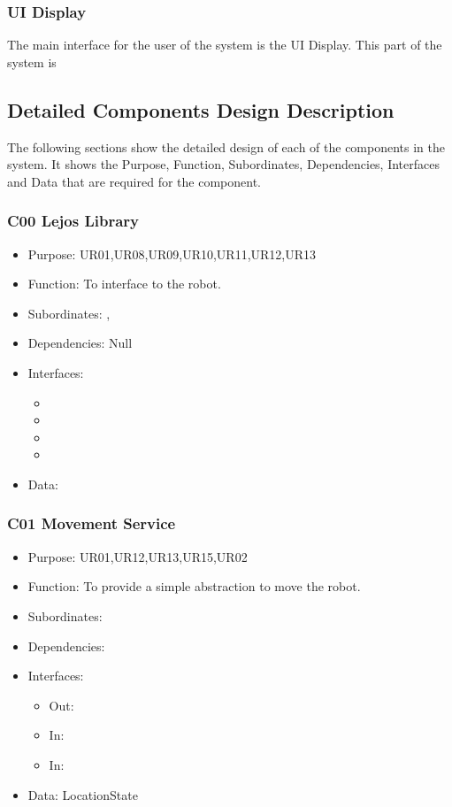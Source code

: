 \subsubsection*{UI Display}
The main interface for the user of the system is the UI Display. This part of the system is 

\subsection{Detailed Components Design Description}\label{detailedSection}
The following sections show the detailed design of each of the components in the system. It shows the Purpose, Function, Subordinates, Dependencies, Interfaces and Data that are required for the component.

\subsubsection{C00 Lejos Library}\label{compLejos}
\begin{itemize}
	\item Purpose: UR01,UR08,UR09,UR10,UR11,UR12,UR13
	\item Function: To interface to the robot. 
	\item Subordinates: ,  
	\item Dependencies: Null
	\item Interfaces:
	\begin{itemize}
		\item \texttt{}
		\item \texttt{}
		\item \texttt{}
		\item \texttt{}
	\end{itemize}
	\item Data:
\end{itemize}

\subsubsection{C01 Movement Service} \label{compMove}
\begin{itemize}
	\item Purpose: UR01,UR12,UR13,UR15,UR02
	\item Function: To provide a simple abstraction to move the robot.
	\item Subordinates: 
	\item Dependencies: 
	\item Interfaces:
	\begin{itemize}
		\item Out: \texttt{}
		\item In: \texttt{}
		\item In: \texttt{}
	\end{itemize}
	\item Data: LocationState
\end{itemize}

